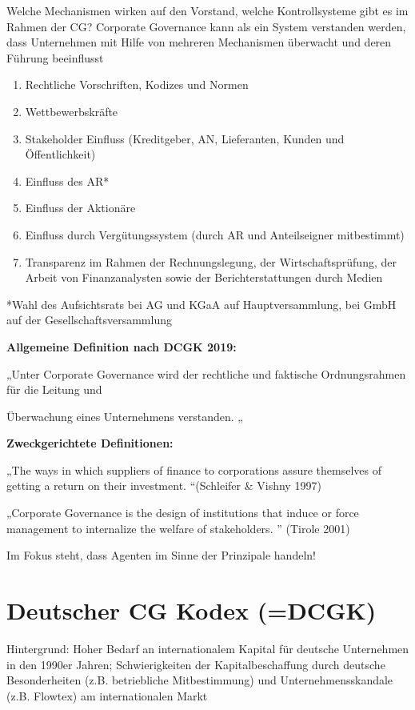 \documentclass[
]{article}
\providecommand{\tightlist}{%
  \setlength{\itemsep}{0pt}\setlength{\parskip}{0pt}}
\begin{document}
Welche Mechanismen wirken auf den Vorstand, welche Kontrollsysteme gibt
es im Rahmen der CG? Corporate Governance kann als ein System verstanden
werden, dass Unternehmen mit Hilfe von mehreren Mechanismen überwacht
und deren Führung beeinflusst

\begin{enumerate}
\def\labelenumi{\arabic{enumi}.}
\tightlist
\item
  Rechtliche Vorschriften, Kodizes und Normen
\item
  Wettbewerbskräfte
\item
  Stakeholder Einfluss (Kreditgeber, AN, Lieferanten, Kunden und
  Öffentlichkeit)
\item
  Einfluss des AR*
\item
  Einfluss der Aktionäre
\item
  Einfluss durch Vergütungssystem (durch AR und Anteilseigner
  mitbestimmt)
\item
  Transparenz im Rahmen der Rechnungslegung, der Wirtschaftsprüfung, der
  Arbeit von Finanzanalysten sowie der Berichterstattungen durch Medien
\end{enumerate}

*Wahl des Aufsichtsrats bei AG und KGaA auf Hauptversammlung, bei GmbH
auf der Gesellschaftsversammlung

\textbf{Allgemeine Definition nach DCGK 2019:}

„Unter Corporate Governance wird der rechtliche und faktische
Ordnungsrahmen für die Leitung und

Überwachung eines Unternehmens verstanden. „

\textbf{Zweckgerichtete Definitionen:}

„The ways in which suppliers of finance to corporations assure
themselves of getting a return on their investment. ``(Schleifer \&
Vishny 1997)

„Corporate Governance is the design of institutions that induce or force
management to internalize the welfare of stakeholders. '' (Tirole 2001)

Im Fokus steht, dass Agenten im Sinne der Prinzipale handeln!

\hypertarget{deutscher-cg-kodex-dcgk}{%
\section{Deutscher CG Kodex (=DCGK)}\label{deutscher-cg-kodex-dcgk}}

Hintergrund: Hoher Bedarf an internationalem Kapital für deutsche
Unternehmen in den 1990er Jahren; Schwierigkeiten der Kapitalbeschaffung
durch deutsche Besonderheiten (z.B. betriebliche Mitbestimmung) und
Unternehmensskandale (z.B. Flowtex) am internationalen Markt
\end{document}
